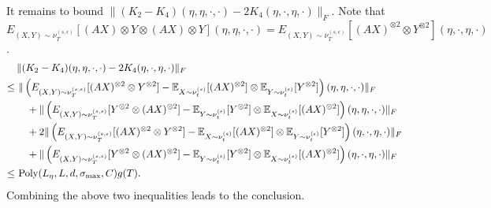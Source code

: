 It remains to bound $\|(K_2-K_4)(\eta,\eta,\cdot, \cdot) - 2K_4(\eta,\cdot,\eta,\cdot)\|_F$. 
Note that $E_{(X,Y)\sim \nu_T^{(s,\epsilon)}} [ (AX)\otimes Y\otimes (AX)\otimes Y](\eta,\eta,\cdot,\cdot)  = E_{(X,Y)\sim \nu_T^{(s,\epsilon)}} [ (AX)^{\otimes 2}\otimes Y^{\otimes 2}](\eta,\cdot,\eta,\cdot)$.
\begin{align*}
& \|(K_2-K_4)(\eta,\eta,\cdot, \cdot) - 2K_4(\eta,\cdot,\eta,\cdot)\|_F \\
\le\,  & \,\|\left( E_{(X,Y)\sim \nu_T^{(s,\epsilon)}} [ (AX)^{\otimes 2}\otimes Y^{\otimes 2}]- \mathbb{E}_{X\sim \nu_t^{(s)}}[(AX)^{\otimes 2}] \otimes \mathbb{E}_{Y\sim \nu_t^{(\epsilon)}}[Y^{\otimes 2}]\right)(\eta,\eta,\cdot,\cdot)\|_F \\
& \quad + \|\left( E_{(X,Y)\sim \nu_T^{(s,\epsilon)}} [ Y^{\otimes 2}\otimes (AX)^{\otimes 2}]- \mathbb{E}_{Y\sim \nu_t^{(\epsilon)}}[Y^{\otimes 2}] \otimes \mathbb{E}_{X\sim \nu_t^{(s)}}[(AX)^{\otimes 2}]\right)(\eta,\eta,\cdot,\cdot)\|_F \\
& \quad + 2\|\left( E_{(X,Y)\sim \nu_T^{(s,\epsilon)}} [ (AX)^{\otimes 2}\otimes Y^{\otimes 2}]- \mathbb{E}_{X\sim \nu_t^{(s)}}[(AX)^{\otimes 2}] \otimes \mathbb{E}_{Y\sim \nu_t^{(\epsilon)}}[Y^{\otimes 2}]\right)(\eta,\cdot,\eta,\cdot)\|_F \\
& \quad + \|\left( E_{(X,Y)\sim \nu_T^{(s,\epsilon)}} [ Y^{\otimes 2}\otimes (AX)^{\otimes 2}]- \mathbb{E}_{Y\sim \nu_t^{(\epsilon)}}[Y^{\otimes 2}] \otimes \mathbb{E}_{X\sim \nu_t^{(s)}}[(AX)^{\otimes 2}]\right)(\eta,\cdot,\eta, \cdot)\|_F \\
\le \, &\, \text{Poly}(L_{\eta}, L, d, \sigma_{\max}, C)g(T). 
\end{align*}
Combining the above two inequalities leads to the conclusion.


